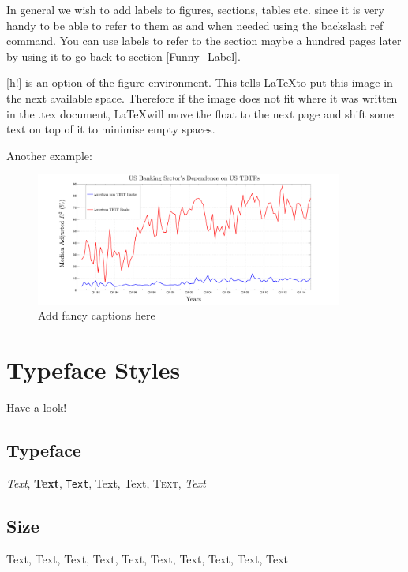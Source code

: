 \documentclass[a4paper,12pt]{article}
\begin{document}
In general we wish to add labels to figures, sections, tables etc. since it is very
handy to be able to refer to them as and when needed using the backslash ref command.
You can use labels to refer to the section maybe a hundred pages later
by using it to go back to section \ref{Funny_Label}. 

[h!] is an option of the figure environment. This tells \LaTeX to put this image in
the next available space. Therefore if the image does not fit where it was written in
the .tex document, \LaTeX will move the float to the next page and shift some text on top of
it to minimise empty spaces. 

Another example:

 \begin{figure}[h!tbp] %
 	\centering
 	\includegraphics[width=0.9\textwidth]{Banking_Sector_US.pdf}
 	\caption{Add fancy captions here}
 	\label{Fig:Cum_fraction_eigen_US} 
 \end{figure}
 
 \section{Typeface Styles}
 
 Have a look!
 
 \subsection{Typeface}
 
 \emph{Text}, \textbf{Text}, \texttt{Text}, \textrm{Text},
 \textsf{Text}, \textsc{Text}, \textit{Text}
 
 \subsection{Size}
 
 {\tiny Text}, {\scriptsize Text}, {\footnotesize Text},
 {\small Text}, {\normalsize Text}, {\large Text}, {\Large
 	Text}, {\LARGE Text}, {\huge Text}, {\Huge Text}
 
\end{document}
